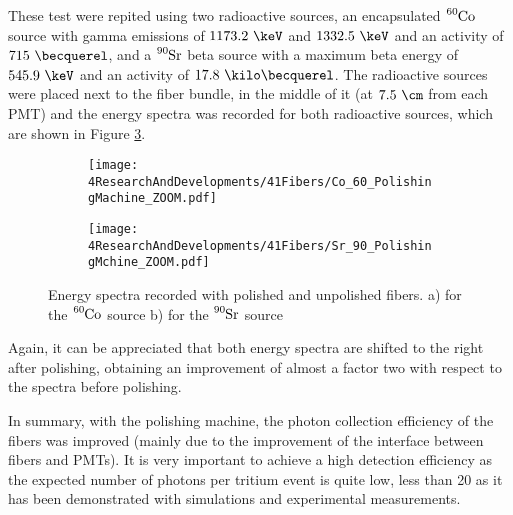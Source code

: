 These test were repited using two radioactive sources, an encapsulated $\ce{^{60}Co}$ source with gamma emissions of $1173.2~\keV$ and $1332.5~\keV$ and an activity of $715~\becquerel$, and a $\ce{^{90}Sr}$ beta source with a maximum beta energy of $545.9~\keV$ and an activity of $17.8~\kilo\becquerel$. The radioactive sources were placed next to the fiber bundle, in the middle of it (at $7.5~\cm$ from each PMT) and the energy spectra was recorded for both radioactive sources, which are shown in Figure \ref{fig:ResultsOfPolishingMachineSources}. 

\begin{figure}
\centering
    \begin{subfigure}[b]{1\textwidth}
    \centering
    \texttt{[image: 4ResearchAndDevelopments/41Fibers/Co\_60\_PolishingMachine\_ZOOM.pdf]}  
    \caption{\label{subfig:EnergySpectrumCo60PolishingTest}}
    \end{subfigure}
    \hfill
    \begin{subfigure}[b]{1\textwidth}
    \centering
    \texttt{[image: 4ResearchAndDevelopments/41Fibers/Sr\_90\_PolishingMchine\_ZOOM.pdf]}  
    \caption{\label{subfig:EnergySpectrumSr90PolishingTest}}
    \end{subfigure}
 \caption{Energy spectra recorded with polished and unpolished fibers. a) for the $\ce{^{60}Co}$ source b) for the $\ce{^{90}Sr}$ source}
 \label{fig:ResultsOfPolishingMachineSources}
\end{figure}

Again, it can be appreciated that both energy spectra are shifted to the right after polishing, obtaining an improvement of almost a factor two with respect to the spectra before polishing. 

In summary, with the polishing machine, the photon collection efficiency of the fibers was improved (mainly due to the improvement of the interface between fibers and PMTs). It is very important to achieve a high detection efficiency as the expected number of photons per tritium event is quite low, less than 20 as it has been demonstrated with simulations and experimental measurements.